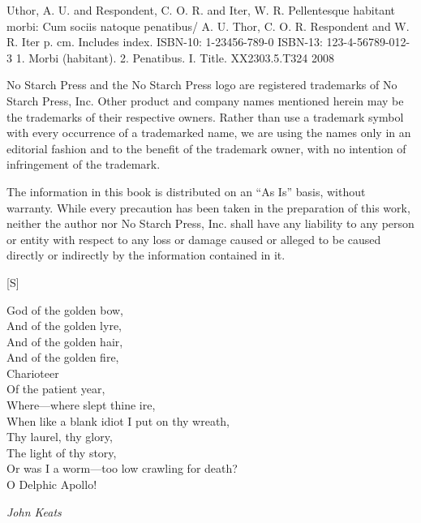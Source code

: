 \begin{copyrightpage}
\begin{cipblock}
Uthor, A. U. and Respondent, C. O. R. and Iter, W. R.
  Pellentesque habitant morbi: Cum sociis natoque penatibus/
  A. U. Thor, C. O. R. Respondent and W. R. Iter
       p. cm.
  Includes index.
  ISBN-10: 1-23456-789-0
  ISBN-13: 123-4-56789-012-3
  1.  Morbi (habitant).  2. Penatibus. I. Title.
XX2303.5.T324 2008
\end{cipblock}

No Starch Press and the No Starch Press logo are registered trademarks
of No Starch Press, Inc. Other product and company names mentioned
herein may be the trademarks of their respective owners. Rather than
use a trademark symbol with every occurrence of a trademarked name, we
are using the names only in an editorial fashion and to the benefit of
the trademark owner, with no intention of infringement of the
trademark.

The information in this book is distributed on an ``As Is'' basis,
without warranty. While every precaution has been taken in the
preparation of this work, neither the author nor No Starch Press, Inc.
shall have any liability to any person or entity with respect to any
loss or damage caused or alleged to be caused directly or indirectly
by the information contained in it.

\vspace{0.7in}

[S]

\end{copyrightpage}

\begin{dedicationpage}
  God of the golden bow,\\
      And of the golden lyre,\\
And of the golden hair,\\
      And of the golden fire,\\
            Charioteer\\
            Of the patient year,\\
      Where---where slept thine ire,\\
When like a blank idiot I put on thy wreath,\\
      Thy laurel, thy glory,\\
      The light of thy story,\\
Or was I a worm---too low crawling for death?\\
      O Delphic Apollo!

\bigskip
\emph{John Keats}
\end{dedicationpage}


